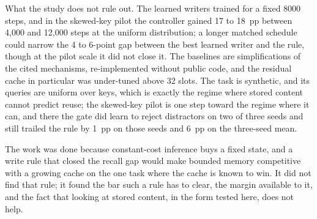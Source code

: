 \documentclass[conference]{IEEEtran}
\begin{document}
What the study does not rule out. The learned writers trained for a fixed
8000 steps, and in the skewed-key pilot the controller gained 17 to 18~pp
between 4{,}000 and 12{,}000 steps at the uniform distribution; a longer matched schedule could narrow the 4 to
6-point gap between the best learned writer and the rule, though at the pilot
scale it did not close it. The baselines are simplifications of the cited mechanisms,
re-implemented without public code, and the residual cache in particular was
under-tuned above 32 slots. The task is synthetic, and its queries are
uniform over keys, which is exactly the regime where stored content cannot
predict reuse; the skewed-key pilot is one step toward the regime where it
can, and there the gate did learn to reject distractors on two of three seeds
and still trailed the rule by 1~pp on those seeds and 6~pp on the three-seed
mean.

The work was done because constant-cost inference buys a fixed state, and a
write rule that closed the recall gap would make bounded memory competitive
with a growing cache on the one task where the cache is known to win. It did
not find that rule; it found the bar such a rule has to clear, the margin
available to it, and the fact that looking at stored content, in the form
tested here, does not help.



\end{document}
